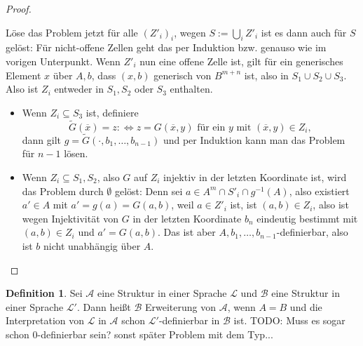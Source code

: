 \documentclass[a4paper, 11pt]{report}
\newcommand{\fA}{\mathcal{A}}
\newcommand{\fB}{\mathcal{B}}
\newcommand{\lingua}{\mathcal{L}}
\theoremstyle{definition}
\newtheorem{definition}[subsection]{Definition}
\begin{document}
\begin{proof}
\begin{itemize}
\begin{itemize}
			Löse das Problem jetzt für alle $(Z'_i)_i$, wegen $S:=\bigcup\limits_i Z'_i$ ist es dann auch für $S$ gelöst: Für nicht-offene Zellen geht das per Induktion bzw. genauso wie im vorigen Unterpunkt. Wenn $Z'_i$ nun eine offene Zelle ist, gilt für ein generisches Element $x$ über $A,b$, dass $(x,b)$ generisch von $B^{m+n}$ ist, also in $S_1\cup S_2\cup S_3$. Also ist $Z_i$ entweder in $S_1,S_2$ oder $S_3$ enthalten.
			\begin{itemize}
				\item Wenn $Z_i\subseteq S_3$ ist, definiere $$\tilde{G}(\overline{x})=z:\Leftrightarrow z=G(\overline{x},y)\text{ für ein }y\text{ mit }(\overline{x},y)\in Z_i,$$ dann gilt $g=\tilde{G}(\cdot,b_1,\dots,b_{n-1})$ und per Induktion kann man das Problem für $n-1$ lösen.
				\item Wenn $Z_i\subseteq S_1,S_2$, also $G$ auf $Z_i$ injektiv in der letzten Koordinate ist, wird das Problem durch $\emptyset$ gelöst: Denn sei $a\in A^m\cap S'_i\cap g^{-1}(A)$, also existiert $a'\in A$ mit $a'=g(a)=G(a,b)$, weil $a\in Z'_i$ ist, ist $(a,b)\in Z_i$, also ist wegen Injektivität von $G$ in der letzten Koordinate $b_n$ eindeutig bestimmt mit $(a,b)\in Z_i$ und $a'=G(a,b)$. Das ist aber $A,b_1,\dots,b_{n-1}$-definierbar, also ist $b$ nicht unabhängig über $A$.
			\end{itemize}
		\end{itemize}
	\end{itemize}
\end{proof}

\begin{definition}
	Sei $\fA$ eine Struktur in einer Sprache $\lingua$ und $\fB$ eine Struktur in einer Sprache $\lingua'$. Dann heißt $\fB$ Erweiterung von $\fA$, wenn $A=B$ und die Interpretation von $\lingua$ in $\fA$ schon $\lingua'$-definierbar in $\fB$ ist. TODO: Muss es sogar schon 0-definierbar sein? sonst später Problem mit dem Typ...
\end{definition}
\end{document}
